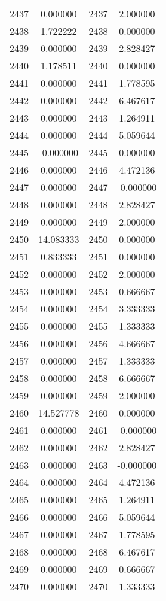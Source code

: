 \documentclass[12pt]{article}
\begin{document}
\begin{longtable}{@{}cccc@{}}
2437 & 0.000000 & 2437 & 2.000000 \\
2438 & 1.722222 & 2438 & 0.000000 \\
2439 & 0.000000 & 2439 & 2.828427 \\
2440 & 1.178511 & 2440 & 0.000000 \\
2441 & 0.000000 & 2441 & 1.778595 \\
2442 & 0.000000 & 2442 & 6.467617 \\
2443 & 0.000000 & 2443 & 1.264911 \\
2444 & 0.000000 & 2444 & 5.059644 \\
2445 & -0.000000 & 2445 & 0.000000 \\
2446 & 0.000000 & 2446 & 4.472136 \\
2447 & 0.000000 & 2447 & -0.000000 \\
2448 & 0.000000 & 2448 & 2.828427 \\
2449 & 0.000000 & 2449 & 2.000000 \\
2450 & 14.083333 & 2450 & 0.000000 \\
2451 & 0.833333 & 2451 & 0.000000 \\
2452 & 0.000000 & 2452 & 2.000000 \\
2453 & 0.000000 & 2453 & 0.666667 \\
2454 & 0.000000 & 2454 & 3.333333 \\
2455 & 0.000000 & 2455 & 1.333333 \\
2456 & 0.000000 & 2456 & 4.666667 \\
2457 & 0.000000 & 2457 & 1.333333 \\
2458 & 0.000000 & 2458 & 6.666667 \\
2459 & 0.000000 & 2459 & 2.000000 \\
2460 & 14.527778 & 2460 & 0.000000 \\
2461 & 0.000000 & 2461 & -0.000000 \\
2462 & 0.000000 & 2462 & 2.828427 \\
2463 & 0.000000 & 2463 & -0.000000 \\
2464 & 0.000000 & 2464 & 4.472136 \\
2465 & 0.000000 & 2465 & 1.264911 \\
2466 & 0.000000 & 2466 & 5.059644 \\
2467 & 0.000000 & 2467 & 1.778595 \\
2468 & 0.000000 & 2468 & 6.467617 \\
2469 & 0.000000 & 2469 & 0.666667 \\
2470 & 0.000000 & 2470 & 1.333333 \\

\end{longtable}
\end{document}
